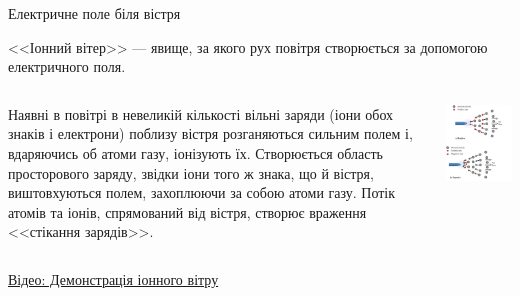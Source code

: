 \documentclass{beamer}
\begin{document}
\begin{frame}{Електричне поле біля вістря}{}
\begin{onlyenv}
\begin{block}{}
			<<Іонний вітер>> --- явище, за якого рух повітря створюється за допомогою
			електричного поля.
		\end{block}
		\begin{columns}
			\begin{column}{0.6\linewidth}
				\begin{block}{}\justifying\small
					Наявні в повітрі в невеликій кількості вільні заряди (іони обох знаків і електрони)
					поблизу вістря розганяються сильним полем і, вдаряючись об атоми газу, іонізують
					їх. Створюється область просторового заряду, звідки іони того ж знака, що й вістря,
					виштовхуються полем, захоплюючи за собою атоми газу. Потік атомів та іонів,
					спрямований від вістря, створює враження <<стікання зарядів>>.
				\end{block}
			\end{column}
			\begin{column}{0.4\linewidth}\centering
				\includegraphics[width=\linewidth]{ion_wind}
			\end{column}
		\end{columns}
		\begin{block}{}
			\href{https://www.youtube.com/watch?v=LNobNwDX2jQ}{Відео: Демонстрація іонного вітру}
		\end{block}
	\end{onlyenv}
\end{frame}
\end{document}
